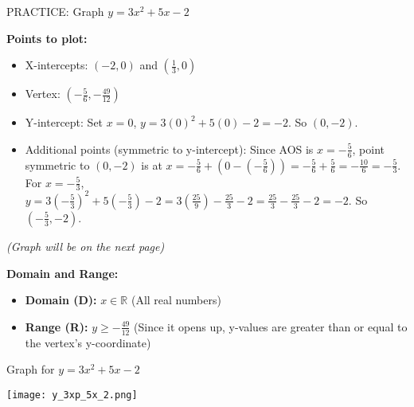 \documentclass[aspectratio=169]{beamer}
\begin{document}
\begin{frame}{PRACTICE: Graph $y = 3x^2 + 5x - 2$}
    \begin{tcolorbox}[colback=lightgray,colframe=primary,title=Graph - $y = 3x^2 + 5x - 2$]
        \footnotesize
        \textbf{Points to plot:}\
        \begin{itemize}
            \item X-intercepts: $(-2,0)$ and $(\frac{1}{3},0)$
            \item Vertex: $(-\frac{5}{6}, -\frac{49}{12})$
            \item Y-intercept: Set $x=0$, $y = 3(0)^2 + 5(0) - 2 = -2$. So $(0,-2)$.
            \item Additional points (symmetric to y-intercept): Since AOS is $x=-\frac{5}{6}$, point symmetric to $(0,-2)$ is at $x = -\frac{5}{6} + (0 - (-\frac{5}{6})) = -\frac{5}{6} + \frac{5}{6} = -\frac{10}{6} = -\frac{5}{3}$. For $x=-\frac{5}{3}$, $y = 3(-\frac{5}{3})^2 + 5(-\frac{5}{3}) - 2 = 3(\frac{25}{9}) - \frac{25}{3} - 2 = \frac{25}{3} - \frac{25}{3} - 2 = -2$. So $(-\frac{5}{3},-2)$.
        \end{itemize}
        \vspace{0.5em}
        \textit{(Graph will be on the next page)}
        
        \textbf{Domain and Range:}\
        \begin{itemize}
            \item \textbf{Domain (D):} $x \in \mathbb{R}$ (All real numbers)
            \item \textbf{Range (R):} $y \ge -\frac{49}{12}$ (Since it opens up, y-values are greater than or equal to the vertex's y-coordinate)
        \end{itemize}
    \end{tcolorbox}
\end{frame}

\begin{frame}{Graph for $y = 3x^2 + 5x - 2$}
    \begin{tcolorbox}[colback=lightgray,colframe=primary,title=Visual Representation]
        \centering
        \texttt{[image: y\_3xp\_5x\_2.png]}
    \end{tcolorbox}
\end{frame}
\end{document}
